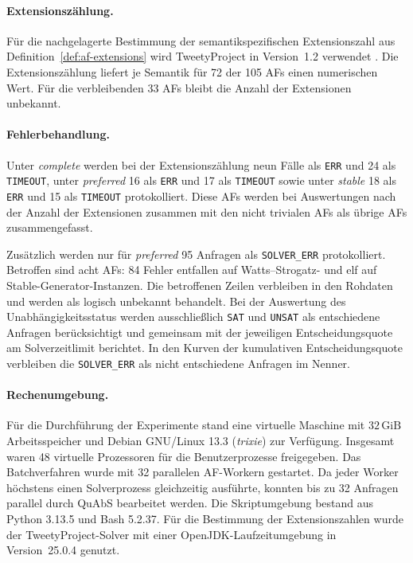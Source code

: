 \paragraph{Extensionszählung.}
Für die nachgelagerte Bestimmung der semantikspezifischen Extensionszahl
aus Definition~\ref{def:af-extensions} wird
TweetyProject in Version~1.2 verwendet \parencite{thimm:2018}. Die
Extensionszählung liefert je Semantik für 72 der 105 AFs einen numerischen
Wert. Für die verbleibenden 33 AFs bleibt die Anzahl der Extensionen
unbekannt.

\paragraph{Fehlerbehandlung.}
Unter \emph{complete} werden bei der Extensionszählung neun Fälle als
\texttt{ERR} und 24 als \texttt{TIMEOUT}, unter \emph{preferred} 16 als
\texttt{ERR} und 17 als \texttt{TIMEOUT} sowie unter \emph{stable} 18 als
\texttt{ERR} und 15 als \texttt{TIMEOUT} protokolliert. 
Diese AFs werden bei
Auswertungen nach der Anzahl der Extensionen zusammen mit den nicht 
trivialen AFs als übrige AFs zusammengefasst. 

Zusätzlich werden nur für \emph{preferred} 95 Anfragen als
\texttt{SOLVER\_ERR} protokolliert. Betroffen
sind acht AFs: 84 Fehler entfallen auf Watts--Strogatz- und elf auf
Stable-Generator-Instanzen. Die betroffenen Zeilen verbleiben in den Rohdaten
und werden als logisch unbekannt behandelt. Bei der Auswertung des
Unabhängigkeitsstatus werden ausschließlich \texttt{SAT} und \texttt{UNSAT}
als entschiedene Anfragen berücksichtigt und gemeinsam mit der jeweiligen
Entscheidungsquote am Solverzeitlimit berichtet. In den Kurven der kumulativen
Entscheidungsquote verbleiben die
\texttt{SOLVER\_ERR} als nicht entschiedene Anfragen im Nenner.

\paragraph{Rechenumgebung.}
Für die Durchführung der Experimente stand eine virtuelle Maschine mit
\(32\,\mathrm{GiB}\) Arbeitsspeicher und Debian GNU/Linux 13.3
(\emph{trixie}) zur Verfügung. Insgesamt waren 48 virtuelle Prozessoren für
die Benutzerprozesse freigegeben. Das Batchverfahren wurde mit 32 parallelen
AF-Workern gestartet. Da jeder Worker höchstens einen Solverprozess
gleichzeitig ausführte, konnten bis zu 32 Anfragen parallel durch QuAbS
bearbeitet werden. Die Skriptumgebung bestand aus Python 3.13.5 und Bash
5.2.37. Für die Bestimmung der Extensionszahlen wurde der TweetyProject-Solver
mit einer OpenJDK-Laufzeitumgebung in Version~25.0.4 genutzt.

